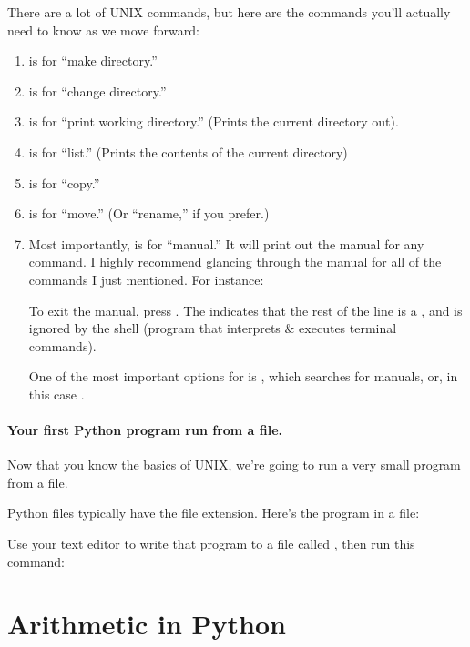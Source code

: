 
There are a lot of UNIX commands, but here are the commands you'll
actually need to know as we move forward:

\begin{enumerate}
\item {} is for ``make directory.''
\item {} is for ``change directory.''
\item {} is for ``print working directory.'' (Prints the
  current directory out).
\item {} is for ``list.'' (Prints the contents of the current
  directory)
\item {} is for ``copy.''
\item {} is for ``move.'' (Or ``rename,'' if you prefer.)
\item Most importantly,  is for ``manual.'' It will print
  out the manual for any command. I highly recommend glancing through
  the manual for all of the commands I just mentioned. For instance:


  To exit the manual, press . The \code{#} indicates that the
  rest of the line is a , and is ignored by the shell
  (program that interprets \& executes terminal commands).

  One of the most important options for  is ,
  which searches for manuals, or, in this case .

\end{enumerate}

\paragraph{Your first Python program run from a file.}

Now that you know the basics of UNIX, we're going to run a very small
program from a file.

Python files typically have the  file extension. Here's the
 program in a file:


Use your text editor to write that program to a file called
, then run this command:


\section{Arithmetic in Python}

